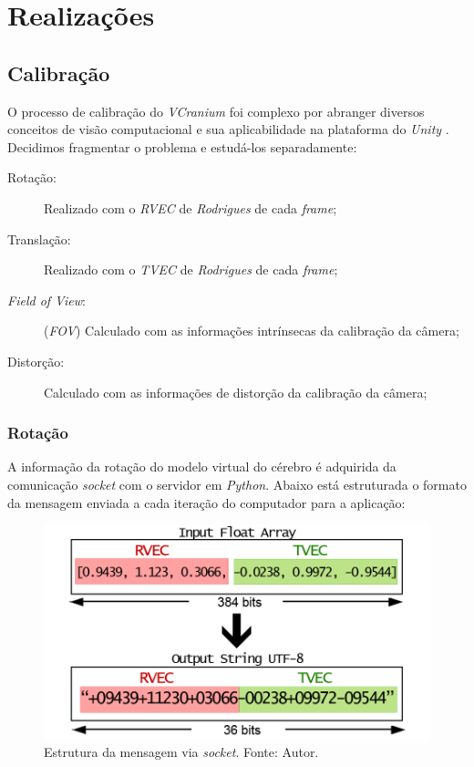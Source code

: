 \chapter{Realizações}\label{chp:realizacoes}

\section{Calibração}\label{chp:calibr}

O processo de calibração do \textit{VCranium} foi complexo por abranger diversos conceitos de visão computacional e sua aplicabilidade na plataforma do \textit{Unity} \cite{UnityOficial}. Decidimos fragmentar o problema e estudá-los separadamente:

\begin{description}
    \item[Rotação:] Realizado com o \textit{RVEC} de \textit{Rodrigues} de cada \textit{frame};
    \item[Translação:] Realizado com o \textit{TVEC} de \textit{Rodrigues} de cada \textit{frame};
    \item[\textit{Field of View}:] (\textit{FOV}) Calculado com as informações intrínsecas da calibração da câmera;
    \item[Distorção:] Calculado com as informações de distorção da calibração da câmera;
\end{description}

\subsection{Rotação}

A informação da rotação do modelo virtual do cérebro é adquirida da comunicação \textit{socket} com o servidor em \textit{Python}. Abaixo está estruturada o formato da mensagem enviada a cada iteração do computador para a aplicação:

\begin{figure}[ht]
    \centering
    \includegraphics[width=.55\textwidth]{figuras/format rodrigues.png}
    \caption{Estrutura da mensagem via \textit{socket}. Fonte: Autor.}
    \label{fig:frodrigues}
\end{figure}

